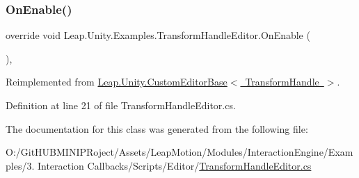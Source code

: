 \subsubsection{\texorpdfstring{OnEnable()}{OnEnable()}}
{\footnotesize\ttfamily override void Leap.\+Unity.\+Examples.\+Transform\+Handle\+Editor.\+On\+Enable (\begin{DoxyParamCaption}{ }\end{DoxyParamCaption})\hspace{0.3cm}{\ttfamily [protected]}, {\ttfamily [virtual]}}



Reimplemented from \mbox{\hyperlink{class_leap_1_1_unity_1_1_custom_editor_base_a2268bc01655342bd3da5ae015bfa2f93}{Leap.\+Unity.\+Custom\+Editor\+Base$<$ Transform\+Handle $>$}}.



Definition at line 21 of file Transform\+Handle\+Editor.\+cs.



The documentation for this class was generated from the following file\+:\begin{DoxyCompactItemize}
\item 
O\+:/\+Git\+H\+U\+B\+M\+I\+N\+I\+P\+Roject/\+Assets/\+Leap\+Motion/\+Modules/\+Interaction\+Engine/\+Examples/3. Interaction Callbacks/\+Scripts/\+Editor/\mbox{\hyperlink{_transform_handle_editor_8cs}{Transform\+Handle\+Editor.\+cs}}\end{DoxyCompactItemize}
